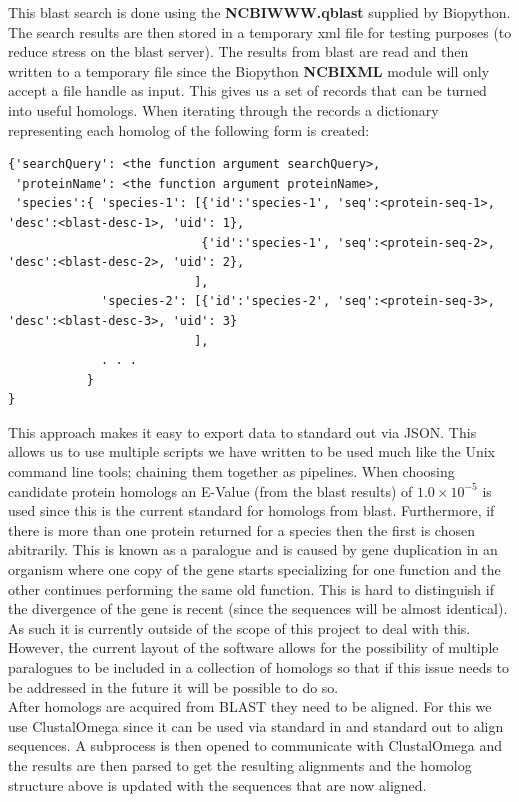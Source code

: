 \documentclass[11pt]{article}
\begin{document}
This blast search is done using the {\bf NCBIWWW.qblast} supplied by
Biopython. The search results are then stored in a temporary xml file
for testing purposes (to reduce stress on the blast server). The
results from blast are read and then written to a temporary file
since the Biopython {\bf NCBIXML} module will only accept a file
handle as input. This gives us a set of records that can be turned
into useful homologs. When iterating through the records a
dictionary representing each homolog of the following form is
created: \\
{\footnotesize
\begin{verbatim}
{'searchQuery': <the function argument searchQuery>,
 'proteinName': <the function argument proteinName>,
 'species':{ 'species-1': [{'id':'species-1', 'seq':<protein-seq-1>, 'desc':<blast-desc-1>, 'uid': 1},
                           {'id':'species-1', 'seq':<protein-seq-2>, 'desc':<blast-desc-2>, 'uid': 2},
                          ],
             'species-2': [{'id':'species-2', 'seq':<protein-seq-3>, 'desc':<blast-desc-3>, 'uid': 3}
                          ],
             . . .
           }
}
\end{verbatim}
}
This approach makes it easy to export data to standard out via
JSON. This allows us to use multiple scripts we have written to
be used much like the Unix command line tools; chaining them
together as pipelines. When choosing candidate protein homologs
an E-Value (from the blast results) of $1.0 \times 10^{-5}$ is used
since this is the current standard for homologs from blast. Furthermore, if
there is more than one protein returned for a species then the first
is chosen abitrarily. This is known as a paralogue and is caused by
gene duplication in an organism where one copy of the gene starts
specializing for one function and the other continues performing the
same old function. This is hard to distinguish if the divergence of
the gene is recent (since the sequences will be almost identical). As
such it is currently outside of the scope of this project to deal with
this. However, the current layout of the software allows for the
possibility of multiple paralogues to be included in a collection of
homologs so that if this issue needs to be addressed in the future it
will be possible to do so. \\

After homologs are acquired from BLAST they need to be aligned. For
this we use ClustalOmega since it can be used via standard in and
standard out to align sequences. A subprocess is then opened to
communicate with ClustalOmega and the results are then parsed to get
the resulting alignments and the homolog structure above is updated
with the sequences that are now aligned. \\
\end{document}
